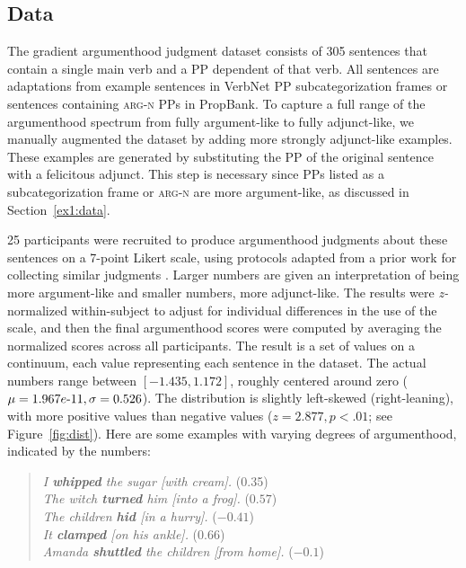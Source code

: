 \documentclass[letterpaper]{article} %
\begin{document}
\subsection{Data}
The gradient argumenthood judgment dataset consists of 305 sentences that contain a single main verb and a PP dependent of that verb. All sentences are adaptations from example sentences in VerbNet PP subcategorization frames or sentences containing \textsc{arg-n} PPs in PropBank. To capture a full range of the argumenthood spectrum from fully argument-like to fully adjunct-like, we manually augmented the dataset by adding more strongly adjunct-like examples. These examples are generated by substituting the PP of the original sentence with a felicitous adjunct. This step is necessary since PPs listed as a subcategorization frame or \textsc{arg-n} are more argument-like, as discussed in Section~\ref{ex1:data}.

25 participants were recruited to produce argumenthood judgments about these sentences on a 7-point Likert scale, using protocols adapted from a prior work for collecting similar judgments \cite{rissman2015using}. Larger numbers are given an interpretation of being more argument-like and smaller numbers, more adjunct-like. The results were \textit{z-}normalized within-subject to adjust for individual differences in the use of the scale, and then the final argumenthood scores were computed by averaging the normalized scores across all participants. The result is a set of values on a continuum, each value representing each sentence in the dataset. The actual numbers range between $[-1.435, 1.172]$, roughly centered around zero ($\mu=1.967e\textnormal{-}11, \sigma=0.526$). The distribution is slightly left-skewed (right-leaning), with more positive values than negative values ($z=2.877, p<.01$; see Figure~\ref{fig:dist}). Here are some examples with varying degrees of argumenthood, indicated by the numbers:

\begin{quote}
\textit{I \textbf{whipped} the sugar [with cream].} (0.35)\\
\hspace{-0.5cm}\textit{The witch \textbf{turned} him [into a frog].} ($0.57$) \\
\hspace{-0.5cm}\textit{The children \textbf{hid} [in a hurry].} ($-0.41$) \\
\hspace{-0.5cm}\textit{It \textbf{clamped} [on his ankle].} ($0.66$) \\
\hspace{-0.5cm}\textit{Amanda \textbf{shuttled} the children [from home].} ($-0.1$)
\end{quote}
\end{document}
